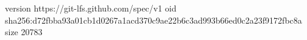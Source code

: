 version https://git-lfs.github.com/spec/v1
oid sha256:d72fbba93a01cb1d0267a1acd370c9ae22b6c3ad993b66ed0c2a23f9172fbc8a
size 20783
